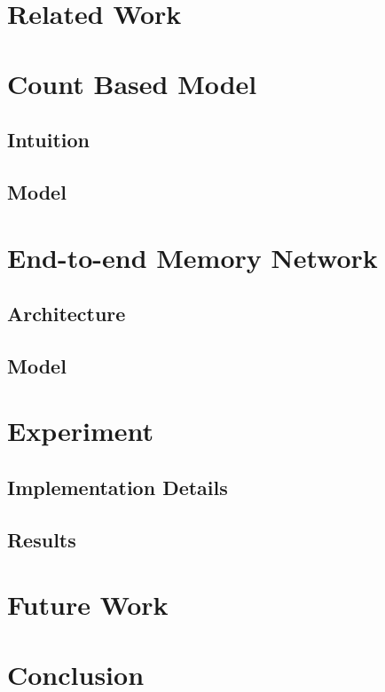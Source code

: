 \documentclass[twoside,11pt]{article}
\begin{document}
\section{Related Work}

\section{Count Based Model}
\subsection{Intuition}
\subsection{Model}

\section{End-to-end Memory Network}
\subsection{Architecture}
\subsection{Model}

\section{Experiment}
\subsection{Implementation Details}

\subsection{Results}

\section{Future Work}

\section{Conclusion}

\end{document}

